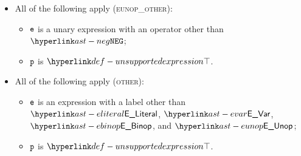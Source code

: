 \begin{itemize}
  \item All of the following apply (\textsc{eunop\_other}):
  \begin{itemize}
    \item $\texttt{e}$ is a unary expression with an operator other than $\NEG$;
    \item $\texttt{p}$ is $\CannotBeTransformed$.
  \end{itemize}

  \item All of the following apply (\textsc{other}):
  \begin{itemize}
    \item $\texttt{e}$ is an expression with a label other than $\ELiteral$, $\EVar$, $\EBinop$, and $\EUnop$;
    \item $\texttt{p}$ is $\CannotBeTransformed$.
  \end{itemize}
\end{itemize}

